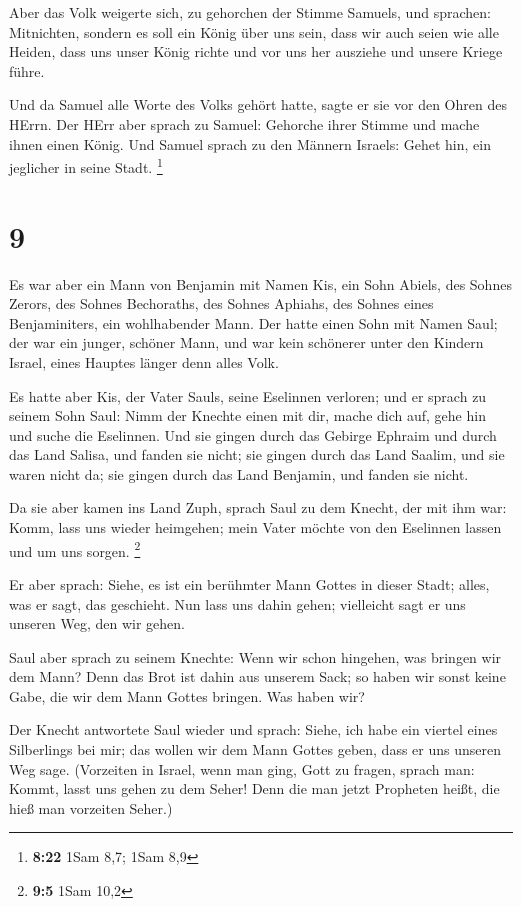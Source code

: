  Aber das Volk weigerte sich, zu gehorchen der Stimme
Samuels, und sprachen: Mitnichten, sondern es soll ein König über uns
sein,  dass wir auch seien wie alle Heiden, dass uns unser
König richte und vor uns her ausziehe und unsere Kriege führe.

 Und da Samuel alle Worte des Volks gehört hatte, sagte er
sie vor den Ohren des HErrn.  Der HErr aber sprach zu
Samuel: Gehorche ihrer Stimme und mache ihnen einen König. Und Samuel
sprach zu den Männern Israels: Gehet hin, ein jeglicher in seine Stadt.
\footnote{\textbf{8:22} 1Sam 8,7; 1Sam 8,9}

\hypertarget{section-2}{%
\section{9}\label{section-2}}

 Es war aber ein Mann von Benjamin mit Namen Kis, ein Sohn
Abiels, des Sohnes Zerors, des Sohnes Bechoraths, des Sohnes Aphiahs,
des Sohnes eines Benjaminiters, ein wohlhabender Mann.  Der
hatte einen Sohn mit Namen Saul; der war ein junger, schöner Mann, und
war kein schönerer unter den Kindern Israel, eines Hauptes länger denn
alles Volk.

 Es hatte aber Kis, der Vater Sauls, seine Eselinnen
verloren; und er sprach zu seinem Sohn Saul: Nimm der Knechte einen mit
dir, mache dich auf, gehe hin und suche die Eselinnen.  Und
sie gingen durch das Gebirge Ephraim und durch das Land Salisa, und
fanden sie nicht; sie gingen durch das Land Saalim, und sie waren nicht
da; sie gingen durch das Land Benjamin, und fanden sie nicht.

 Da sie aber kamen ins Land Zuph, sprach Saul zu dem Knecht,
der mit ihm war: Komm, lass uns wieder heimgehen; mein Vater möchte von
den Eselinnen lassen und um uns sorgen. \footnote{\textbf{9:5} 1Sam 10,2}

 Er aber sprach: Siehe, es ist ein berühmter Mann Gottes in
dieser Stadt; alles, was er sagt, das geschieht. Nun lass uns dahin
gehen; vielleicht sagt er uns unseren Weg, den wir gehen.

 Saul aber sprach zu seinem Knechte: Wenn wir schon
hingehen, was bringen wir dem Mann? Denn das Brot ist dahin aus unserem
Sack; so haben wir sonst keine Gabe, die wir dem Mann Gottes bringen.
Was haben wir?

 Der Knecht antwortete Saul wieder und sprach: Siehe, ich
habe ein viertel eines Silberlings bei mir; das wollen wir dem Mann
Gottes geben, dass er uns unseren Weg sage.  (Vorzeiten in
Israel, wenn man ging, Gott zu fragen, sprach man: Kommt, lasst uns
gehen zu dem Seher! Denn die man jetzt Propheten heißt, die hieß man
vorzeiten Seher.)

